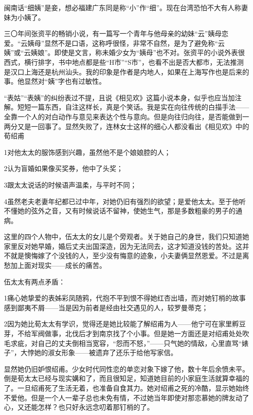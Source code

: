 \par 闽南话“细姨”是妾，想必福建广东同是称“小”作“细”。现在台湾恐怕不大有人称妻妹为小姨了。
\par 三〇年间张资平的畅销小说，有一篇写一个青年与他母亲的幼妹“云”姨母恋爱。“云姨母”显然不是口语，这称呼很怪，非常不自然，是为了避免称“云姨”或“云姨娘”。即使是文言，称未婚少女为“姨母”也不对。张资平的小说外表很西式，横行排字，书中地点都是些“H市”“S市”，也看不出是否大都市，无法推测是汉口上海还是杭州汕头。我的印象是作者是内地人，如果在上海写作也是后来的事。他显然对“姨”字也有过敏性。
\par “表姑”“表姨”的纠纷表过不提，且说《相见欢》这篇小说本身，似乎也应当加注解。短短一篇东西，自注这样长，真是个笑话。我是实在向往传统的白描手法——全靠一个人的对白动作与意见来表达个性与意向。但是向往归向往，是否能做到一两分又是一回事了。显然失败了，连林女士这样的细心人都没看出《相见欢》中的荀绍甫
\par \textcircled{\small{1}}对他太太的服饰感到兴趣，虽然他不是个娘娘腔的人；
\par \textcircled{\small{2}}认为盲婚如果像买奖券，他中了头奖；
\par \textcircled{\small{3}}跟太太说话的时候语声温柔，与平时不同；
\par \textcircled{\small{4}}虽然老夫老妻年纪都已过中年，对她仍旧有强烈的欲望；是爱他太太。至于他听不懂她的弦外之音，又有时候说话不留神，使她生气，那是多数粗豪的男子的通病。
\par 这里的四个人物中，伍太太的女儿是个旁观者。关于她自己的身世，我们只知道她家里反对她早婚，婚后丈夫出国深造，因为无法同去，这才知道没钱的苦处。这并不就是懊悔嫁了个没钱的人，至少没有悔意的迹象，小夫妻俩显然恩爱。不过是离愁加上面对现实——成长的痛苦。
\par 伍太太有两点矛盾：
\par \textcircled{\small{1}}痛心她挚爱的表姊彩凤随鸦，代抱不平到恨不得她红杏出墙，而对她钉梢的故事感到鄙夷不屑——当是因为前者是经由社交遇见的人，较罗曼蒂克；
\par \textcircled{\small{2}}因为她比荀太太有学识，觉得还是她比较能了解绍甫为人——他宁可在家里孵豆芽，不给军阀做事，北伐后才到南京找了个小事。但是她一方面还是对绍甫处处吹毛求疵，对自己的丈夫倒相当宽容，“怨而不怒，”——只气她的情敌，心里直骂“婊子”，大悖她的淑女形象——被遗弃了还乐于给他写家信。
\par 显然她仍旧妒恨绍甫。少女时代同性恋的单恋对象下嫁了他，数十年后余愤未平。倒是荀太太已经与现实媾和了，而且很知足，知道她目前的小家庭生活就算幸福的了。一旦绍甫死了生活无着，也准备自食其力。她对绍甫之死的冷酷，显示她始终不爱他。但是一个人一辈子总也未免有情，不过她当年即使对那恋慕她的牌友动了心，又还能怎样？也只好永远念叨着那钉梢的了。
